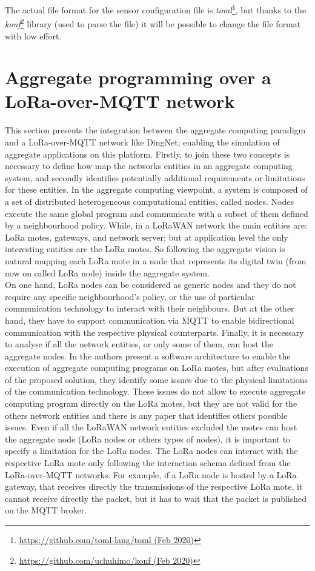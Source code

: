 % 
The actual file format for the sensor configuration file is \textit{toml}\footnote{\href{https://github.com/toml-lang/toml}{https://github.com/toml-lang/toml (Feb 2020)}}, but thanks to the \textit{konf}\footnote{\href{https://github.com/uchuhimo/konf}{https://github.com/uchuhimo/konf (Feb 2020)}} library (used to parse the file) it will be possible to change the file format with low effort.



\section{Aggregate programming over a LoRa-over-MQTT network}
\label{sec:contributionACOverDingNet}
This section presents the integration between the aggregate computing paradigm and a LoRa-over-MQTT network like DingNet; enabling the simulation of aggregate applications on this platform.
Firstly, to join these two concepts is necessary to define how map the networks entities in an aggregate computing system, and secondly identifies potentially additional requirements or limitations for these entities.
In the aggregate computing viewpoint, a system is composed of a set of distributed heterogeneous computational entities, called nodes. Nodes execute the same global program and communicate with a subset of them defined by a neighbourhood policy. 
While, in a LoRaWAN network the main entities are: LoRa motes, gateways, and network server; but at application level the only interesting entities are the LoRa motes.
So following the aggregate vision is natural mapping each LoRa mote in a node that represents its digital twin (from now on called LoRa node) inside the aggregate system.
\\On one hand, LoRa nodes can be considered as generic nodes and they do not require any specific neighbourhood's policy, or the use of particular communication technology to interact with their neighbours. 
But at the other hand, they have to support communication via MQTT to enable bidirectional communication with the respective physical counterparts.
Finally, it is necessary to analyse if all the network entities, or only some of them, can host the aggregate nodes.
In \cite{CCNCPS2018} the authors present a software architecture to enable the execution of aggregate computing programs on LoRa motes, but after evaluations of the proposed solution, they identify some issues due to the physical limitations of the communication technology. 
These issues do not allow to execute aggregate computing program directly on the LoRa motes, but they are not valid for the others network entities and there is any paper that identifies others possible issues.
Even if all the LoRaWAN network entities excluded the motes can host the aggregate node (LoRa nodes or others types of nodes), it is important to specify a limitation for the LoRa nodes. 
The LoRa nodes can interact with the respective LoRa mote only following the interaction schema defined from the LoRa-over-MQTT networks. 
For example, if a LoRa node is hosted by a LoRa gateway, that receives directly the transmissions of the respective LoRa mote, it cannot receive directly the packet, but it has to wait that the packet is published on the MQTT broker.

